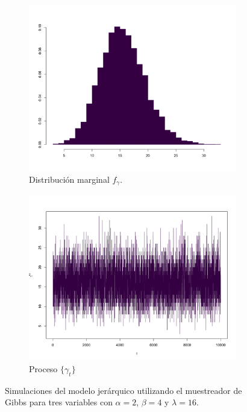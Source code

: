 \documentclass[11pt,a4paper]{article}
\begin{document}
\begin{figure}[!p]
     \vspace{0.2cm}
    
    \begin{subfigure}[t]{0.45\textwidth}
        \centering
        \includegraphics[width=\linewidth]{hier_hist_gamma.png} 
        \caption{Distribución marginal $f_\gamma$.} \label{fig:hier_hist_gamma}
    \end{subfigure}
    \hfill
    \begin{subfigure}[t]{0.45\textwidth}
        \centering
        \includegraphics[width=\linewidth]{hier_chain_gamma.png} 
        \caption{Proceso $\lbrace \gamma_t \rbrace$} \label{fig:hier_chain_gamma}
    \end{subfigure}
    
    \caption{Simulaciones del modelo jerárquico utilizando el muestreador de Gibbs para tres variables con $\alpha = 2$, $\beta = 4$ y $\lambda = 16$.}
    \label{fig:gs_hier}
\end{figure}
\end{document}
